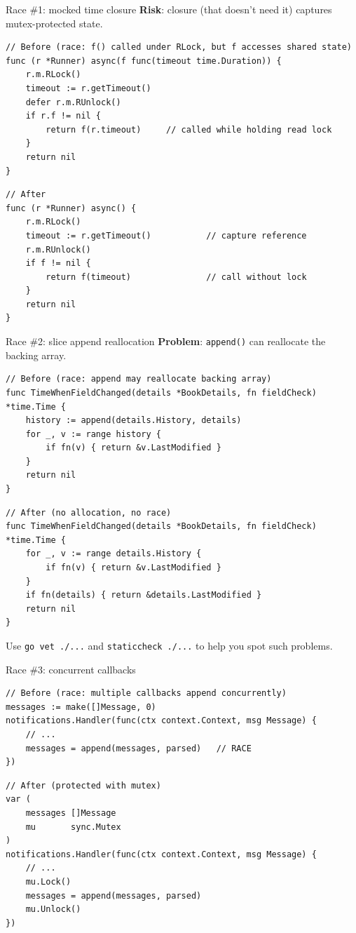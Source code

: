 \documentclass[aspectratio=169,11pt]{beamer}
\begin{document}
\begin{frame}[fragile]{Race \#1: mocked time closure}
  \textbf{Risk}: closure (that doesn't need it) captures mutex-protected state.

\begin{lstlisting}
// Before (race: f() called under RLock, but f accesses shared state)
func (r *Runner) async(f func(timeout time.Duration)) {
	r.m.RLock()
	timeout := r.getTimeout()
	defer r.m.RUnlock()
	if r.f != nil {
		return f(r.timeout)     // called while holding read lock
	}
	return nil
}
\end{lstlisting}
\begin{lstlisting}
// After
func (r *Runner) async() {
	r.m.RLock()
	timeout := r.getTimeout()           // capture reference
	r.m.RUnlock()
	if f != nil {
		return f(timeout)               // call without lock
	}
	return nil
}
\end{lstlisting}
\end{frame}

\begin{frame}[fragile]{Race \#2: slice append reallocation}
  \textbf{Problem}: \texttt{append()} can reallocate the backing array.

\begin{lstlisting}
// Before (race: append may reallocate backing array)
func TimeWhenFieldChanged(details *BookDetails, fn fieldCheck) *time.Time {
	history := append(details.History, details)
	for _, v := range history {
		if fn(v) { return &v.LastModified }
	}
	return nil
}
\end{lstlisting}
\begin{lstlisting}
// After (no allocation, no race)
func TimeWhenFieldChanged(details *BookDetails, fn fieldCheck) *time.Time {
	for _, v := range details.History {
		if fn(v) { return &v.LastModified }
	}
	if fn(details) { return &details.LastModified }
	return nil
}
\end{lstlisting}
\vspace{6pt}
  Use \texttt{go vet ./...} and \texttt{staticcheck ./...} to help you spot such problems.
\end{frame}

\begin{frame}[fragile]{Race \#3: concurrent callbacks}
\begin{lstlisting}
// Before (race: multiple callbacks append concurrently)
messages := make([]Message, 0)
notifications.Handler(func(ctx context.Context, msg Message) {
	// ...
	messages = append(messages, parsed)   // RACE
})
\end{lstlisting}
\begin{lstlisting}
// After (protected with mutex)
var (
	messages []Message
	mu       sync.Mutex
)
notifications.Handler(func(ctx context.Context, msg Message) {
	// ...
	mu.Lock()
	messages = append(messages, parsed)
	mu.Unlock()
})
\end{lstlisting}
\end{frame}
\end{document}
